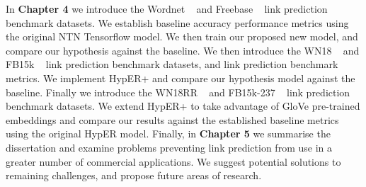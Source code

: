 In \textbf{Chapter 4} we introduce the Wordnet ~\citep{miller1995wordnet} and Freebase ~\citep{bollacker2008freebase} link prediction benchmark datasets. We establish baseline accuracy performance metrics using the original NTN Tensorflow model. We then train our proposed new model, and compare our hypothesis against the baseline. We then introduce the WN18 ~\citep{bordes2014semantic} and FB15k ~\citep{bordes2013translating} link prediction benchmark datasets, and link prediction benchmark metrics. We implement HypER+ and compare our hypothesis model against the baseline. Finally we introduce the WN18RR ~\citep{dettmers2018convolutional} and FB15k-237 ~\citep{toutanova2015observed} link prediction benchmark datasets. We extend HypER+ to take advantage of GloVe pre-trained embeddings and compare our results against the established baseline metrics using the original HypER model. \newline
Finally, in \textbf{Chapter 5} we summarise the dissertation and examine problems preventing link prediction from use in a greater number of commercial applications. We suggest potential solutions to remaining challenges, and propose future areas of research.


